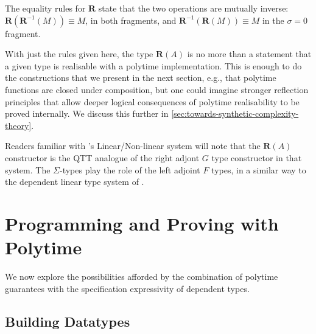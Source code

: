 \documentclass[acmsmall,screen]{acmart}
\newcommand{\Rtype}{\mathbf{R}}
\newcommand{\rIntro}{\mathbf{R}}
\newcommand{\rElim}{\mathbf{R}^{-1}}
\begin{document}
The equality rules for $\Rtype$ state that the two operations are
mutually inverse: $\rIntro(\rElim(M)) \equiv M$, in both fragments,
and $\rElim(\rIntro(M)) \equiv M$ in the $\sigma = 0$ fragment.

With just the rules given here, the type $\Rtype(A)$ is no more than a
statement that a given type is realisable with a polytime
implementation. This is enough to do the constructions that we present
in the next section, e.g., that polytime functions are closed under
composition, but one could imagine stronger reflection principles that
allow deeper logical consequences of polytime realisability to be
proved internally. We discuss this further in
\autoref{sec:towards-synthetic-complexity-theory}.

Readers familiar with \citet{Benton94}'s Linear/Non-linear system will
note that the $\Rtype(A)$ constructor is the QTT analogue of the right
adjont $G$ type constructor in that system. The $\Sigma$-types play
the role of the left adjoint $F$ types, in a similar way to the
dependent linear type system of \citet{KrishnaswamiPB15}.

\section{Programming and Proving with Polytime}
\label{sec:programming-polytime}

We now explore the possibilities afforded by the combination of
polytime guarantees with the specification expressivity of dependent
types.

\subsection{Building Datatypes}
\label{sec:prog-datatypes}
\end{document}
